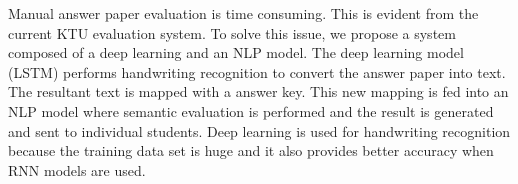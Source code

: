 Manual answer paper evaluation is time consuming. This is evident
from the current KTU evaluation system. To solve this issue,
we propose a system composed of a deep learning and an NLP model.
The deep learning model (LSTM) performs handwriting recognition to
convert the answer paper into text. The resultant text is mapped
with a answer key. This new mapping is fed into an NLP model where
semantic evaluation is performed and the result is generated and
sent to individual students. Deep learning is used for handwriting 
recognition because the training data set is huge and it also 
provides better accuracy when RNN models are used. 
